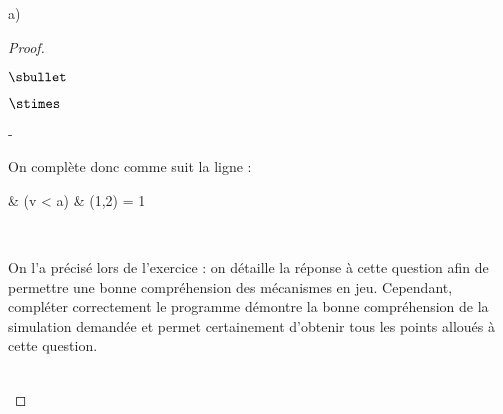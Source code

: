 \documentclass[11pt]{article}%
\begin{document}
\begin{liste}{a)}
\begin{proof}
\begin{noliste}{$\sbullet$}
\begin{noliste}{$\stimes$}
\begin{noliste}{-}
\begin{center}
        \end{center}          
        On complète donc comme suit la ligne  :
        \begin{scilabC}{6}
          & \qquad \qquad {} (v < a)  \nl %
          & \qquad \qquad \qquad {}(1,2) = 1 \nl %
        \end{scilabC}~\\[-1cm]
      \end{noliste}
    \end{noliste}
  \end{noliste}
  \begin{remark}%
    On l'a précisé lors de l'exercice : on détaille la réponse à cette
    question afin de permettre une bonne compréhension des mécanismes
    en jeu. Cependant, compléter correctement le programme \Scilab{}
    démontre la bonne compréhension de la simulation demandée et
    permet certainement d'obtenir tous les points alloués à cette
    question.
  \end{remark}~\\[-1.2cm]
\end{proof}
\end{liste}


\newpage
\end{document}
